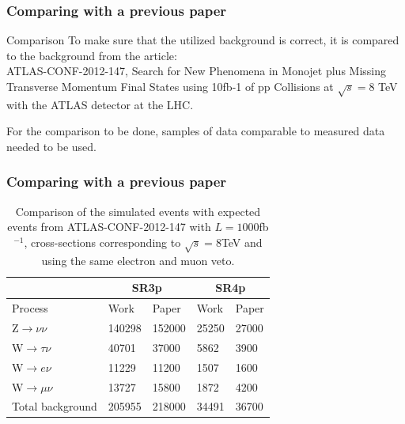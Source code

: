 \documentclass[handout]{beamer}
\begin{document}
\begin{frame}[shrink=20]\frametitle{Comparing with a previous paper}
\begin{block}{Comparison}
To make sure that the utilized background is correct, it is compared to the background from the article:\\
ATLAS-CONF-2012-147, Search for New Phenomena in Monojet plus Missing Transverse Momentum Final States using 10fb-1 of pp Collisions at $\sqrt{s}=8$ TeV with the ATLAS detector at the LHC. 
\end{block}
\begin{block}{}
For the comparison to be done, samples of data comparable to measured data needed to be used.
\end{block}
\end{frame}

\begin{frame}[shrink=33]\frametitle{Comparing with a previous paper}
\begin{table}[ht]
\begin{center}
\begin{tabular}{|l|l|l|l|l|}
\hline
& \multicolumn{2}{c}{SR3p} & \multicolumn{2}{|c|}{SR4p} \\
\hline
Process & Work & Paper & Work & Paper \\ \hline
Z$\rightarrow\nu\nu$ & 140298 & 152000 & 25250 & 27000 \\
W$\rightarrow\tau\nu$ & 40701 & 37000 & 5862 & 3900 \\
W$\rightarrow e\nu$ & 11229 & 11200 & 1507 & 1600 \\
W$\rightarrow\mu\nu$ & 13727 & 15800 & 1872 & 4200 \\ \hline
Total background & 205955 & 218000 & 34491 & 36700 \\ \hline
\end{tabular}
\caption{Comparison of the simulated events with expected events from ATLAS-CONF-2012-147 with $L=1000$fb$^{-1}$, cross-sections corresponding to $\sqrt{s}=8$TeV and using the same electron and muon veto.}
\label{tab:Compare1}
\end{center}
\end{table}


\end{frame}
\end{document}
